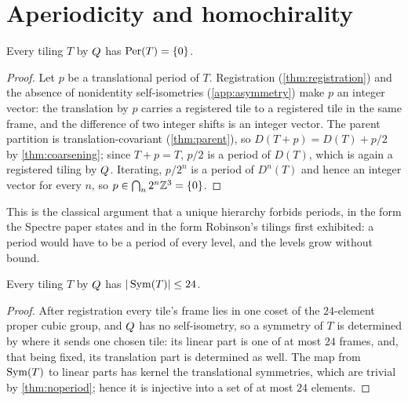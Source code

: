 \section{Aperiodicity and homochirality}\label{sec:aperiodicity}

\begin{theorem}\label{thm:noperiod}
Every tiling $T$ by $Q$ has $\operatorname{Per}(T)=\{0\}$.
\end{theorem}

\begin{proof}
Let $p$ be a translational period of $T$. Registration (\cref{thm:registration}) and the absence
of nonidentity self-isometries (\cref{app:asymmetry}) make $p$ an integer vector: the translation by $p$ carries
a registered tile to a registered tile in the same frame, and the difference of two integer
shifts is an integer vector. The parent partition is translation-covariant (\cref{thm:parent}),
so $D(T+p)=D(T)+p/2$ by \cref{thm:coarsening}; since $T+p=T$, $p/2$ is a period of $D(T)$, which
is again a registered tiling by $Q$. Iterating, $p/2^n$ is a period of $D^n(T)$ and hence an
integer vector for every $n$, so $p\in\bigcap_n 2^n\mathbb{Z}^3=\{0\}$.
\end{proof}

This is the classical argument that a unique hierarchy forbids periods, in the form the Spectre
paper states \cite{SMKGS24b} and in the form Robinson's tilings first exhibited: a period would
have to be a period of every level, and the levels grow without bound.

\begin{theorem}\label{thm:sym}
Every tiling $T$ by $Q$ has $|\operatorname{Sym}(T)|\le24$.
\end{theorem}

\begin{proof}
After registration every tile's frame lies in one coset of the $24$-element proper cubic group,
and $Q$ has no self-isometry, so a symmetry of $T$ is determined by where it sends one
chosen tile: its linear part is one of at most $24$ frames, and, that being fixed, its
translation part is determined as well. The map from $\operatorname{Sym}(T)$ to linear parts has kernel the
translational symmetries, which are trivial by \cref{thm:noperiod}; hence it is injective into a
set of at most $24$ elements.
\end{proof}

